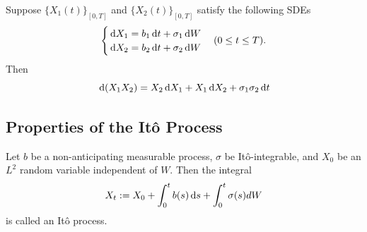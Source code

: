 \begin{theorem}
  Suppose $\{X_1(t)\}_{[0,T]}$ and $\{X_2(t)\}_{[0,T]}$ satisfy the following SDEs
  $$\begin{cases}
      \,\mathrm{d} X_1 = b_1\,\mathrm{d} t+\sigma_1\,\mathrm{d} W \\
      \,\mathrm{d} X_2 = b_2\,\mathrm{d} t+\sigma_2\,\mathrm{d} W
    \end{cases}(0\le t\le T).$$
  Then
  \begin{equation}
    \label{theorem:ito-product}
    \,\mathrm{d} (X_1X_2)=X_2\,\mathrm{d} X_1+X_1\,\mathrm{d} X_2+\sigma_1\sigma_2\,\mathrm{d} t
  \end{equation}
\end{theorem}



\subsection{Properties of the Itô Process}

\begin{definition}
  Let $b$ be a non-anticipating measurable process, $\sigma$ be Itô-integrable, and $X_0$ be an $L^2$ random variable independent of $W$. Then the integral
  $$X_t := X_0 + \int_0^t b(s) \,\mathrm{d} s + \int_0^t \sigma(s) dW$$
  is called an Itô process.
\end{definition}

